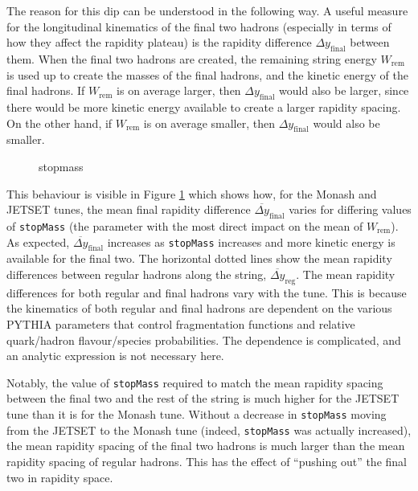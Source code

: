 \documentclass[12pt,a4paper]{report}
\begin{document}
The reason for this dip can be understood in the following way. A useful measure for the longitudinal kinematics of the final two hadrons (especially in terms of how they affect the rapidity plateau) is the rapidity difference $\Delta y_\text{final}$ between them. When the final two hadrons are created, the remaining string energy $W_\text{rem}$ is used up to create the masses of the final hadrons, and the kinetic energy of the final hadrons. If $W_\text{rem}$ is on average larger, then $\Delta y_\text{final}$ would also be larger, since there would be more kinetic energy available to create a larger rapidity spacing. On the other hand, if $W_\text{rem}$ is on average smaller, then $\Delta y_\text{final}$ would also be smaller.

\begin{figure}
  \centering
  
  \caption{stopmass}
  \label{fig:deltay-stopmass}
\end{figure}

This behaviour is visible in Figure \ref{fig:deltay-stopmass} which shows how, for the Monash and JETSET tunes, the mean final rapidity difference $\overline{\Delta y}_\text{final}$ varies for differing values of \texttt{stopMass} (the parameter with the most direct impact on the mean of $W_\text{rem}$). As expected, $\overline{\Delta y}_\text{final}$ increases as \texttt{stopMass} increases and more kinetic energy is available for the final two. The horizontal dotted lines show the mean rapidity differences between regular hadrons along the string, $\overline{\Delta y}_\text{reg}$. The mean rapidity differences for both regular and final hadrons vary with the tune. This is because the kinematics of both regular and final hadrons are dependent on the various PYTHIA parameters that control fragmentation functions and relative quark/hadron flavour/species probabilities. The dependence is complicated, and an analytic expression is not necessary here.

Notably, the value of \texttt{stopMass} required to match the mean rapidity spacing between the final two and the rest of the string is much higher for the JETSET tune than it is for the Monash tune. Without a decrease in \texttt{stopMass} moving from the JETSET to the Monash tune (indeed, \texttt{stopMass} was actually increased), the mean rapidity spacing of the final two hadrons is much larger than the mean rapidity spacing of regular hadrons. This has the effect of ``pushing out'' the final two in rapidity space.
\end{document}
